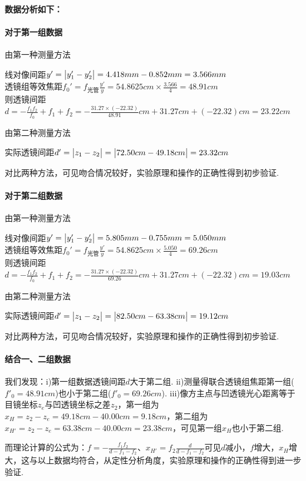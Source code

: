 \documentclass[UTF8]{ctexart}
\begin{document}
\paragraph{数据分析如下：}\quad\par
\paragraph{对于第一组数据}\quad\par
由第一种测量方法
\begin{center}
    线对像间距$y'=\big{|}y_1'-y_2'\big{|}=4.418mm-0.852mm=3.566mm$\\透镜组等效焦距$\displaystyle{f_0'=f_{\text{光管}}\frac{y'}{y}=54.8625cm\times\frac{3.566}{4}=48.91cm}$\\则透镜间距$d=\displaystyle{-\frac{f_1f_2}{f_0}+f_1+f_2}=-\frac{31.27\times(-22.32)}{48.91}cm+31.27cm+(-22.32)cm=23.22cm$
\end{center}
由第二种测量方法
\begin{center}
    实际透镜间距$d'=\big{|}z_1-z_2\big{|}=\big{|}72.50cm-49.18cm\big{|}=23.32cm$
\end{center}
对比两种方法，可见吻合情况较好，实验原理和操作的正确性得到初步验证.

\paragraph{对于第二组数据}\quad\par
由第一种测量方法
\begin{center}
    线对像间距$y'=\big{|}y_1'-y_2'\big{|}=5.805mm-0.755mm=5.050mm$\\透镜组等效焦距$\displaystyle{f_0'=f_{\text{光管}}\frac{y'}{y}=54.8625cm\times\frac{5.050}{4}=69.26cm}$\\则透镜间距$d=\displaystyle{-\frac{f_1f_2}{f_0}+f_1+f_2}=-\frac{31.27\times(-22.32)}{69.26}cm+31.27cm+(-22.32)cm=19.03cm$
\end{center}
由第二种测量方法
\begin{center}
    实际透镜间距$d'=\big{|}z_1-z_2\big{|}=\big{|}82.50cm-63.38cm\big{|}=19.12cm$
\end{center}
对比两种方法，可见吻合情况较好，实验原理和操作的正确性得到初步验证.

\paragraph{结合一、二组数据}我们发现：i)第一组数据透镜间距$d$大于第二组. ii)测量得联合透镜组焦距第一组($f'_0=48.91cm$)也小于第二组($f'_0=69.26cm$). iii)像方主点与凹透镜光心距离等于目镜坐标$z_e$与凹透镜坐标之差$z_2$，第一组为$x_H=z_2-z_e=49.18cm-40.00cm=9.18cm$，第二组为$x_{H'}=z_2-z_e=63.38cm-40.00cm=23.38cm$，可见第一组$x_H$也小于第二组. \par
而理论计算的公式为：$f=-\frac{f_1f_2}{d-f_1-f_2}$、$x_{H'}=f_2\frac{d}{d-f_1-f_2}$可见$d$减小，$f$增大，$x_H$增大，这与以上数据均符合，从定性分析角度，实验原理和操作的正确性得到进一步验证.
\end{document}
